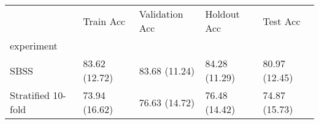 \begin{table}
\centering
\label{tab:sbss_no_sbss}
\begin{tabular}{lllll}
\toprule
{} &      Train Acc & Validation Acc &    Holdout Acc &       Test Acc \\
experiment         &                &                &                &                \\
\midrule
SBSS               &  83.62 (12.72) &  83.68 (11.24) &  84.28 (11.29) &  80.97 (12.45) \\
Stratified 10-fold &  73.94 (16.62) &  76.63 (14.72) &  76.48 (14.42) &  74.87 (15.73) \\
\bottomrule
\end{tabular}
\end{table}

